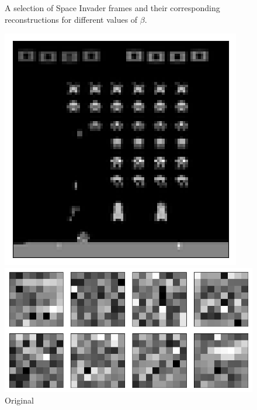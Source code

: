\begin{figure}[h!]
\begin{multicols}{4}
    \caption{$\beta = 4$}
\end{multicols}
\caption{A selection of Space Invader frames and their corresponding reconstructions for different values of $\beta$.}
\label{fig:indiscriminate_decoupling_originals_and_reconstructions}
\end{figure}


\begin{figure}[h!]
\centering
\captionsetup{justification=centering}
\begin{minipage}{0.4\textwidth}
\centering
\captionsetup{justification=centering}
\includegraphics[scale=0.4]{figures/results/indiscriminate_decoupling/beta_1_sample_3_original.png}
\caption{Original}
\end{minipage}
\begin{minipage}{0.55\textwidth}
\centering
\captionsetup{justification=centering}
\includegraphics[scale=0.42]{figures/results/indiscriminate_decoupling/beta_1_convolutional_layers_sample_3.png}

\end{minipage}
\end{figure}
